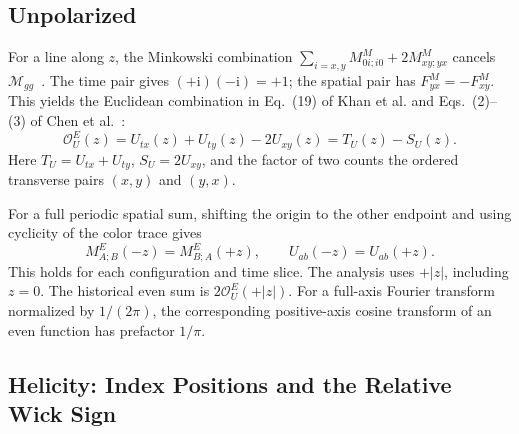 \documentclass[11pt,a4paper]{article}
\newcommand{\ii}{\mathrm{i}}
\newcommand{\OPE}{\mathcal O}
\begin{document}
\subsection{Unpolarized}
For a line along \(z\), the Minkowski combination
\(\sum_{i=x,y}M^M_{0i;i0}+2M^M_{xy;yx}\) cancels
\(\mathcal M_{gg}\)~\cite{Khan,BMRU}. The time pair gives
\((+\ii)(-\ii)=+1\); the spatial pair has
\(F^M_{yx}=-F^M_{xy}\). This yields the Euclidean combination in Eq.~(19)
of Khan et al. and Eqs.~(2)--(3) of Chen et al.~\cite{Khan,Chen}:
\begin{equation}
 \OPE_U^E(z)=U_{tx}(z)+U_{ty}(z)-2U_{xy}(z)=T_U(z)-S_U(z).
 \label{eq:unpol}
\end{equation}
Here \(T_U=U_{tx}+U_{ty}\), \(S_U=2U_{xy}\), and the factor of two counts
the ordered transverse pairs \((x,y)\) and \((y,x)\).

For a full periodic spatial sum, shifting the origin to the other endpoint
and using cyclicity of the color trace gives
\begin{equation}
 M^E_{A;B}(-z)=M^E_{B;A}(+z),\qquad U_{ab}(-z)=U_{ab}(+z).
 \label{eq:endpoint-exchange}
\end{equation}
This holds for each configuration and time slice. The analysis uses
\(+|z|\), including \(z=0\). The historical even sum is
\(2\OPE_U^E(+|z|)\). For a full-axis Fourier transform normalized by
\(1/(2\pi)\), the corresponding positive-axis cosine transform of an even
function has prefactor \(1/\pi\).

\subsection{Helicity: Index Positions and the Relative Wick Sign}
\label{sec:helicity-wick}
\end{document}
